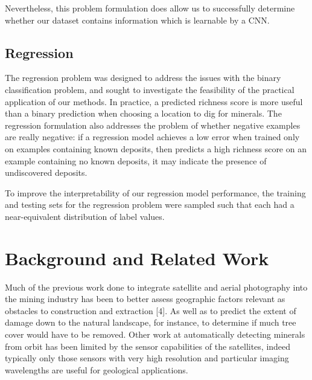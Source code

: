 \documentclass[10pt]{article}
\begin{document}
Nevertheless, this problem formulation does allow us to successfully determine
whether our dataset contains information which is learnable by a CNN. 

\subsection{Regression}

The regression problem was designed to address the issues with the
binary classification problem, and sought to investigate the feasibility of
the practical application of our methods. In practice, a predicted richness
score is more useful than a binary prediction when choosing a location to dig
for minerals. The regression formulation also addresses the problem of
whether negative examples are really negative: if a regression model
achieves a low error when trained only on examples containing known deposits,
then predicts a high richness score on an example containing no known deposits,
it may indicate the presence of undiscovered deposits.

To improve the interpretability of our regression model performance,
the training and testing sets for the regression problem were sampled
such that each had a near-equivalent distribution of label values.

\section{Background and Related Work}

Much of the previous work done to integrate satellite and aerial photography into
the mining industry has been to better assess geographic factors relevant as
obstacles to construction and extraction [4]. As well as to predict the extent of
damage down to the natural landscape, for instance, to determine if much tree cover would have
to be removed. Other work at automatically detecting minerals from orbit has been
limited by the sensor capabilities of the satellites, indeed typically only those
sensors with very high resolution and particular imaging wavelengths are useful
for geological applications. 


\end{document}

